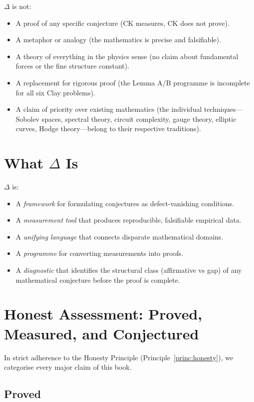 \documentclass[12pt, openany]{book}
\theoremstyle{remark}
\begin{document}
$\Delta$ is not:
\begin{itemize}
  \item A proof of any specific conjecture (CK measures, CK does not prove).
  \item A metaphor or analogy (the mathematics is precise and falsifiable).
  \item A theory of everything in the physics sense (no claim about fundamental forces
        or the fine structure constant).
  \item A replacement for rigorous proof (the Lemma A/B programme is incomplete for
        all six Clay problems).
  \item A claim of priority over existing mathematics (the individual techniques---Sobolev
        spaces, spectral theory, circuit complexity, gauge theory, elliptic curves,
        Hodge theory---belong to their respective traditions).
\end{itemize}

\section{What $\Delta$ Is}

$\Delta$ is:
\begin{itemize}
  \item A \emph{framework} for formulating conjectures as defect-vanishing conditions.
  \item A \emph{measurement tool} that produces reproducible, falsifiable empirical data.
  \item A \emph{unifying language} that connects disparate mathematical domains.
  \item A \emph{programme} for converting measurements into proofs.
  \item A \emph{diagnostic} that identifies the structural class (affirmative vs gap)
        of any mathematical conjecture before the proof is complete.
\end{itemize}


\section{Honest Assessment: Proved, Measured, and Conjectured}
\label{sec:honest-assessment}

In strict adherence to the Honesty Principle (Principle~\ref{princ:honesty}), we
categorise every major claim of this book.

\subsection{Proved}
\end{document}

